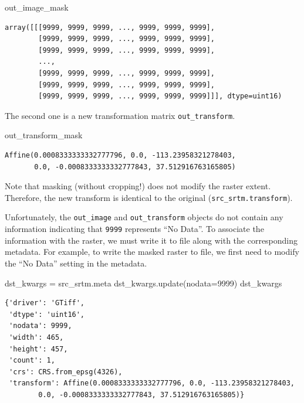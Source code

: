 \documentclass[
  letterpaper,
]{krantz}
\newenvironment{Shaded}{\begin{snugshade}}{\end{snugshade}}
\newcommand{\DecValTok}[1]{\textcolor[rgb]{0.68,0.00,0.00}{#1}}
\newcommand{\NormalTok}[1]{\textcolor[rgb]{0.00,0.23,0.31}{#1}}
\newcommand{\OperatorTok}[1]{\textcolor[rgb]{0.37,0.37,0.37}{#1}}
\begin{document}
\begin{Shaded}
\begin{Highlighting}[]
\NormalTok{out\_image\_mask}
\end{Highlighting}
\end{Shaded}

\begin{verbatim}
array([[[9999, 9999, 9999, ..., 9999, 9999, 9999],
        [9999, 9999, 9999, ..., 9999, 9999, 9999],
        [9999, 9999, 9999, ..., 9999, 9999, 9999],
        ...,
        [9999, 9999, 9999, ..., 9999, 9999, 9999],
        [9999, 9999, 9999, ..., 9999, 9999, 9999],
        [9999, 9999, 9999, ..., 9999, 9999, 9999]]], dtype=uint16)
\end{verbatim}

The second one is a new transformation matrix \texttt{out\_transform}.

\begin{Shaded}
\begin{Highlighting}[]
\NormalTok{out\_transform\_mask}
\end{Highlighting}
\end{Shaded}

\begin{verbatim}
Affine(0.0008333333332777796, 0.0, -113.23958321278403,
       0.0, -0.0008333333332777843, 37.512916763165805)
\end{verbatim}

Note that masking (without cropping!) does not modify the raster extent.
Therefore, the new transform is identical to the original
(\texttt{src\_srtm.transform}).

Unfortunately, the \texttt{out\_image} and \texttt{out\_transform}
objects do not contain any information indicating that \texttt{9999}
represents ``No Data''. To associate the information with the raster, we
must write it to file along with the corresponding metadata. For
example, to write the masked raster to file, we first need to modify the
``No Data'' setting in the metadata.

\begin{Shaded}
\begin{Highlighting}[]
\NormalTok{dst\_kwargs }\OperatorTok{=}\NormalTok{ src\_srtm.meta}
\NormalTok{dst\_kwargs.update(nodata}\OperatorTok{=}\DecValTok{9999}\NormalTok{)}
\NormalTok{dst\_kwargs}
\end{Highlighting}
\end{Shaded}

\begin{verbatim}
{'driver': 'GTiff',
 'dtype': 'uint16',
 'nodata': 9999,
 'width': 465,
 'height': 457,
 'count': 1,
 'crs': CRS.from_epsg(4326),
 'transform': Affine(0.0008333333332777796, 0.0, -113.23958321278403,
        0.0, -0.0008333333332777843, 37.512916763165805)}
\end{verbatim}
\end{document}
